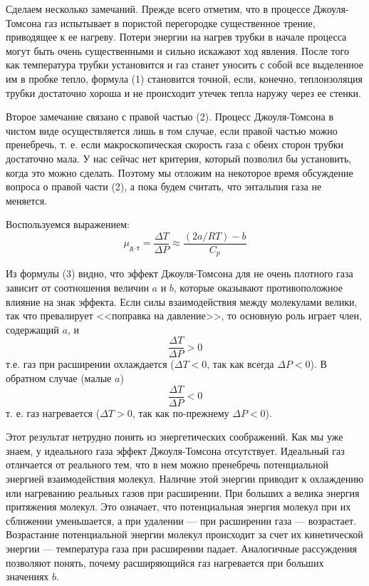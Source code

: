 \documentclass[a4paper,12pt]{article}
\theoremstyle{plain} %
\theoremstyle{definition} %
\theoremstyle{remark} %
\begin{document}
Сделаем несколько замечаний. Прежде всего отметим, что в процессе Джоуля-Томсона газ испытывает в пористой перегородке существенное трение, приводящее к ее нагреву. Потери энергии на нагрев трубки в начале процесса могут быть очень существенными и сильно искажают ход явления. После того как температура трубки установится и газ станет уносить с собой все выделенное им в пробке тепло, формула (1) становится точной, если, конечно, теплоизоляция трубки достаточно хороша и не происходит утечек тепла наружу через ее стенки.

Второе замечание связано с правой частью (2). Процесс Джоуля-Томсона в чистом виде осуществляется лишь в том случае, если правой частью можно пренебречь, т. е. если макроскопическая скорость газа с обеих сторон трубки достаточно мала. У нас сейчас нет критерия, который позволил бы установить, когда это можно сделать. Поэтому мы отложим на некоторое время обсуждение вопроса о правой части (2), а пока будем считать, что энтальпия газа не меняется.

Воспользуемся выражением:
\begin{equation}
\mu_\text{д--т} = \frac{\Delta T}{\Delta P} \approx \frac{(2a/RT)-b}{C_p}
\end{equation}

Из формулы (3) видно, что эффект Джоуля-Томсона для не очень плотного газа зависит от соотношения величин $a$ и $b$, которые оказывают противоположное влияние на знак эффекта. Если силы взаимодействия между молекулами велики, так что превалирует <<поправка на давление>>, то основную роль играет член, содержащий $a$, и
\[\frac{\Delta T}{\Delta P} > 0\]
т.е. газ при расширении охлаждается ($\Delta T < 0$, так как всегда $\Delta P < 0$). В обратном случае (малые $a$)
\[\frac{\Delta T}{\Delta P} < 0\]
т. е. газ нагревается ($\Delta T >0$, так как по-прежнему $\Delta P < 0$).

Этот результат нетрудно понять из энергетических соображений. Как мы уже знаем, у идеального газа эффект Джоуля-Томсона отсутствует. Идеальный газ отличается от реального тем, что в нем можно пренебречь потенциальной энергией взаимодействия молекул. Наличие этой энергии приводит к охлаждению или нагреванию реальных газов при расширении. При больших а велика энергия притяжения молекул. Это означает, что потенциальная энергия молекул при их сближении уменьшается, а при удалении — при расширении газа — возрастает. Возрастание потенциальной энергии молекул происходит за счет их кинетической энергии — температура газа при расширении падает. Аналогичные рассуждения позволяют понять, почему расширяющийся газ нагревается при больших значениях $b$.
\end{document}

